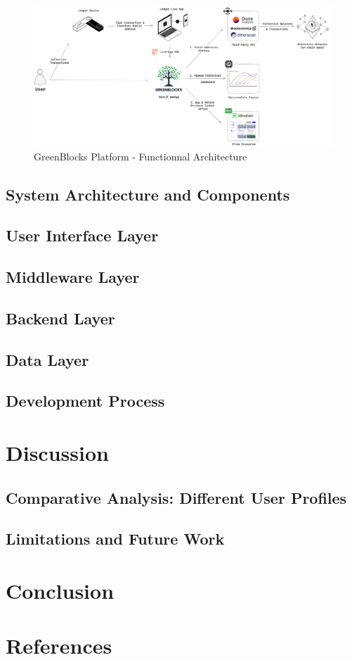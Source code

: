 \documentclass[12pt]{article}
\begin{document}
\begin{figure}[h!]
    \centering
    \centerline{\includegraphics[scale=0.125]{figures/greenblocks_functionnal.png}}
    \caption{GreenBlocks Platform - Functionnal Architecture} 
    \label{fig:functionnal_architecture}
\end{figure}
\blindtext
\subsection{System Architecture and Components}
\subsection{User Interface Layer}
\subsection{Middleware Layer}
\subsection{Backend Layer}
\subsection{Data Layer}
\subsection{Development Process}
\section{Discussion}
\subsection{Comparative Analysis: Different User Profiles}
\subsection{Limitations and Future Work}

\section{Conclusion}

\section{References}

\end{document}
